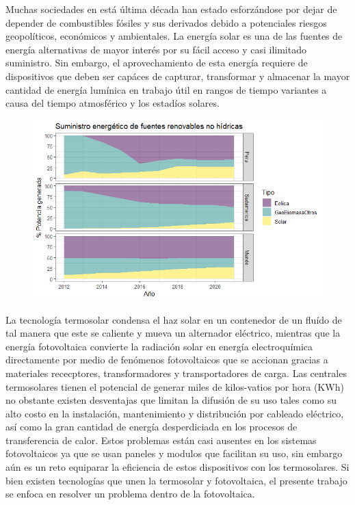 Muchas sociedades en está última década han estado esforzándose por dejar de depender de combustibles
fósiles y sus derivados debido a potenciales riesgos geopolíticos, económicos y ambientales. La energía solar
es una de las fuentes de energía alternativas de mayor interés por su fácil acceso y casi ilimitado suministro.
Sin embargo, el aprovechamiento de esta energía requiere de dispositivos que deben ser capáces de capturar, transformar 
y almacenar la mayor cantidad de energía lumínica en trabajo útil en rangos de tiempo variantes a causa del tiempo atmosférico y
los estadíos solares.

\begin{figure}[h]
    \includegraphics[scale=0.8]{img/PorcentajeRenovables.png}
\end{figure}

La tecnología termosolar condensa el haz solar en un contenedor de un fluído de tal manera que este se caliente
y mueva un alternador eléctrico, mientras que la energía fotovoltaica convierte la radiación solar en energía electroquímica directamente 
por medio de fenómenos fotovoltaicos que se accionan gracias a materiales rececptores, transformadores y transportadores de carga.
Las centrales termosolares tienen el potencial de generar miles de kilos-vatios por hora (KWh) no obstante 
existen desventajas que limitan la difusión de su uso tales como su alto costo en la instalación, mantenimiento y distribución por cableado 
eléctrico, así como la gran cantidad de energía desperdiciada en los procesos de transferencia de calor. Estos problemas están casi ausentes
en los sistemas fotovoltaicos ya que se usan paneles y modulos que facilitan su uso, sin embargo aún es un reto equiparar la eficiencia de estos 
dispositivos con los termosolares. Si bien existen tecnologías que unen la termosolar y fotovoltaica, el presente trabajo se enfoca en resolver
un problema dentro de la fotovoltaica.

